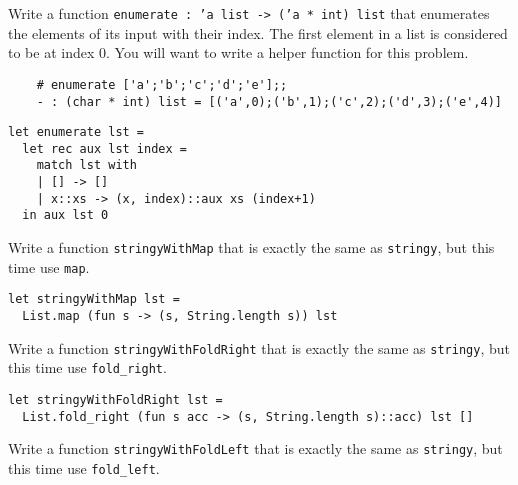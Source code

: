 \documentclass[addpoints]{exam}
\begin{document}
\begin{questions}
  
  \question
  Write a function 
  \texttt{enumerate : 'a list -> ('a * int) list} 
  that enumerates the elements of its input with their index.
  The first element in a list is considered to be at index 0.
  You will want to write a helper function for this problem.
  \begin{verbatim}
    # enumerate ['a';'b';'c';'d';'e'];;
    - : (char * int) list = [('a',0);('b',1);('c',2);('d',3);('e',4)]
  \end{verbatim}

  \begin{solutionbox}{4cm}
    \begin{verbatim}
let enumerate lst =
  let rec aux lst index =
    match lst with
    | [] -> []
    | x::xs -> (x, index)::aux xs (index+1)
  in aux lst 0
    \end{verbatim}
  \end{solutionbox}

  
  \vspace{1em}
  \vspace{1em}

  \question 
  Write a function \texttt{stringyWithMap}
  that is exactly the same as \texttt{stringy},
  but this time use \texttt{map}.

  \begin{solutionbox}{2cm}
    \begin{verbatim}
let stringyWithMap lst =
  List.map (fun s -> (s, String.length s)) lst
    \end{verbatim}
  \end{solutionbox}

  
  \question 
  Write a function \texttt{stringyWithFoldRight}
  that is exactly the same as \texttt{stringy},
  but this time use \texttt{fold\_right}.

  \begin{solutionbox}{2cm}
    \begin{verbatim}
let stringyWithFoldRight lst =
  List.fold_right (fun s acc -> (s, String.length s)::acc) lst []
    \end{verbatim}
  \end{solutionbox}

  
  \question 
  Write a function \texttt{stringyWithFoldLeft}
  that is exactly the same as \texttt{stringy},
  but this time use \texttt{fold\_left}.


\end{questions}
\end{document}
